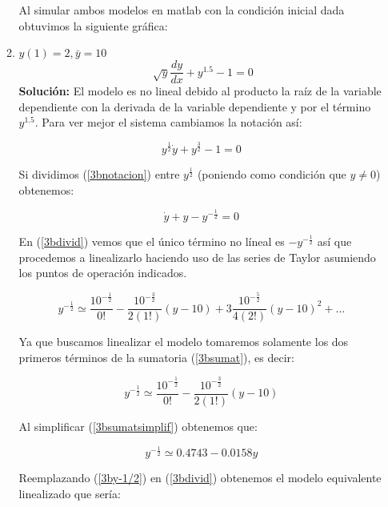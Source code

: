 \documentclass[letterpaper, 12pt]{article}
\begin{document}
\begin{enumerate}
\begin{enumerate}
Al simular ambos modelos en matlab con la condición inicial dada obtuvimos la siguiente gráfica:



\item $y(1)=2,\bar{y}=10$
\begin{equation}
     \sqrt[]{y}\frac{dy}{dx}+y^{1.5}-1 = 0
\end{equation}
\textbf{Solución:}
El modelo es no lineal debido al producto la raíz de la variable dependiente con la derivada de la variable dependiente y por el término $y^{1.5}$.
Para ver mejor el sistema cambiamos la notación así:

\begin{equation}
     y^{\frac{1}{2}}\dot{y}+y^{\frac{3}{2}}-1 = 0
     \label{3bnotacion}
\end{equation}

Si dividimos (\ref{3bnotacion}) entre $y^{\frac{1}{2}}$ (poniendo como condición que $y\neq0$) obtenemos:

\begin{equation}
     \dot{y}+y-y^{-\frac{1}{2}} = 0
     \label{3bdivid}
\end{equation}

En (\ref{3bdivid}) vemos que el único término no líneal es $-y^{-\frac{1}{2}}$ así que procedemos a linealizarlo haciendo uso de las series de Taylor asumiendo los puntos de operación indicados.

\begin{equation}
    y^{-\frac{1}{2}}\simeq \frac{10^{-\frac{1}{2}}}{0!}-\frac{10^{-\frac{3}{2}}}{{2(1!)}}(y-10)+3\frac{10^{-\frac{5}{2}}}{{4(2!)}}(y-10)^2+...
    \label{3bsumat}
\end{equation}

Ya que buscamos linealizar el modelo tomaremos solamente los dos primeros términos de la sumatoria (\ref{3bsumat}), es decir:

\begin{equation}
    y^{-\frac{1}{2}}\simeq \frac{10^{-\frac{1}{2}}}{0!}-\frac{10^{-\frac{3}{2}}}{{2(1!)}}(y-10)
    \label{3bsumatsimplif}
\end{equation}

Al simplificar (\ref{3bsumatsimplif}) obtenemos que:

\begin{equation}
    y^{-\frac{1}{2}}\simeq 0.4743-0.0158y
    \label{3by-1/2}
\end{equation}

Reemplazando (\ref{3by-1/2}) en (\ref{3bdivid}) obtenemos el modelo equivalente linealizado que sería:



\end{enumerate}
\end{enumerate}
\end{document}
